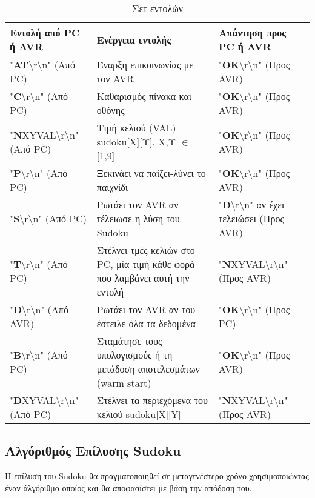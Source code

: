 \documentclass[a4paper,12pt]{article}
\begin{document}
\begin{table}[h!]
\centering
\begin{tabular}[c]{| p{} | p{} | p{} |}
\hline
\textbf{Εντολή από PC ή AVR} & \textbf{Ενέργεια εντολής} & \textbf{Απάντηση προς PC ή AVR} \\
\hline
"\textbf{AT}\textbackslash r\textbackslash n" (Από PC) & Έναρξη επικοινωνίας με τον AVR & "\textbf{OK}\textbackslash r\textbackslash n" (Προς AVR)\\
\hline
"\textbf{C}\textbackslash r\textbackslash n" (Από PC) & Καθαρισμός πίνακα και οθόνης  & "\textbf{OK}\textbackslash r\textbackslash n" (Προς AVR)\\
\hline
"\textbf{N}XYVAL\textbackslash r\textbackslash n" (Από PC) &  Τιμή κελιού (VAL) sudoku[Χ][Υ], Χ,Υ $\in$ [1,9] & "\textbf{OK}\textbackslash r\textbackslash n" (Προς AVR)\\
\hline
"\textbf{P}\textbackslash r\textbackslash n" (Από PC) & Ξεκινάει να παίζει-λύνει το παιχνίδι & "\textbf{OK}\textbackslash r\textbackslash n" (Προς AVR)\\
\hline
"\textbf{S}\textbackslash r\textbackslash n" (Από PC) & Ρωτάει τον AVR αν τέλειωσε η λύση του Sudoku  & "\textbf{D}\textbackslash r\textbackslash n" αν έχει τελειώσει (Προς AVR)\\
\hline
"\textbf{T}\textbackslash r\textbackslash n" (Από PC) & Στέλνει τμές κελιών στο PC, μία τιμή κάθε φορά που λαμβάνει αυτή την εντολή & "\textbf{N}XYVAL\textbackslash r\textbackslash n" (Προς AVR)\\
\hline
"\textbf{D}\textbackslash r\textbackslash n" (Από AVR) & Ρωτάει τον AVR αν του έστειλε όλα τα δεδομένα & "\textbf{OK}\textbackslash r\textbackslash n" (Προς PC)\\
\hline
"\textbf{B}\textbackslash r\textbackslash n" (Από PC) & Σταμάτησε τους υπολογισμούς ή τη μετάδοση αποτελεσμάτων (warm start) & "\textbf{OK}\textbackslash r\textbackslash n" (Προς AVR)\\
\hline
"\textbf{D}XYVAL\textbackslash r\textbackslash n" (Από PC) & Στέλνει τα περιεχόμενα του κελιού sudoku[X][Y] & "\textbf{N}XYVAL\textbackslash r\textbackslash n" (Προς AVR)\\
\hline
\end{tabular}
\renewcommand{\arraystretch}{1.2}
\caption{Σετ εντολών}
\label{table:commands}
\end{table}


\subsection{Αλγόριθμός Επίλυσης Sudoku}
Η επίλυση του Sudoku θα πραγματοποιηθεί σε μεταγενέστερο χρόνο χρησιμοποιώντας έναν άλγόριθμο οποίος και θα αποφασίστει με βάση την απόδοση του.
\end{document}

